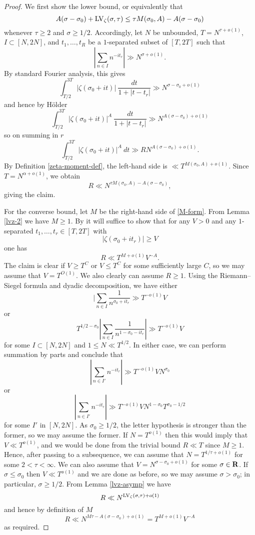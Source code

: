 \begin{proof}  We first show the lower bound, or equivalently that
$$ A(\sigma-\sigma_0) + \mathrm{LV}_\zeta(\sigma,\tau) \leq \tau M(\sigma_0,A) - A(\sigma-\sigma_0)$$
whenever $\tau \geq 2$ and $\sigma \geq 1/2$.  Accordingly, let $N$ be unbounded, $T = N^{\tau+o(1)}$, $I \subset [N,2N]$, and $t_1,\dots,t_R$ be a $1$-separated subset of $[T,2T]$ such that
$$ |\sum_{n \in I} n^{-it_r}| \gg N^{\sigma+o(1)}.$$
By standard Fourier analysis, this gives
$$ \int_{T/2}^{3T} |\zeta(\sigma_0+it)|\ \frac{dt}{1+|t-t_r|} \gg N^{\sigma - \sigma_0 + o(1)}$$
and hence by H\"older
$$ \int_{T/2}^{3T} |\zeta(\sigma_0+it)|^A\ \frac{dt}{1+|t-t_r|} \gg N^{A(\sigma - \sigma_0) + o(1)}$$
so on summing in $r$
$$ \int_{T/2}^{3T} |\zeta(\sigma_0+it)|^A\ dt \gg R N^{A(\sigma - \sigma_0) + o(1)}.$$
By Definition \ref{zeta-moment-def}, the left-hand side is $\ll T^{M(\sigma_0,A)+o(1)}$.  Since $T = N^{\alpha+o(1)}$, we obtain
$$ R \ll N^{\tau M(\sigma_0,A) - A(\sigma-\sigma_0)},$$
giving the claim.

For the converse bound, let $M$ be the right-hand side of \eqref{M-form}.  From Lemma \ref{lvz-2} we have $M \geq 1$. By \cite[\S 8.1]{ivic} it will suffice to show that for any $V>0$ and any $1$-separated $t_1,\dots,t_r \in [T,2T]$ with
$$ |\zeta(\sigma_0+it_r)| \geq V$$
one has
$$ R \ll T^{M+o(1)} V^{-A}.$$
The claim is clear if $V \geq T^C$ or $V \leq T^C$ for some sufficiently large $C$, so we may assume that $V = T^{O(1)}$.  We also clearly can assume $R \geq 1$.  Using the Riemann--Siegel formula and dyadic decomposition, we have either
$$ |\sum_{n \in I} \frac{1}{n^{\sigma_0+it_r}} \gg T^{-o(1)} V$$
or
$$ T^{1/2-\sigma_0} |\sum_{n \in I} \frac{1}{n^{1-\sigma_0-it_r}}| \gg T^{-o(1)} V$$
for some $I \subset [N,2N]$ and $1 \leq N \ll T^{1/2}$.  In either case, we can perform summation by parts and conclude that
$$ |\sum_{n \in I'} n^{-it_r}|\gg T^{-o(1)} V N^{\sigma_0}$$
or
$$ |\sum_{n \in I'} n^{-it_r}|\gg T^{-o(1)} V N^{1-\sigma_0} T^{\sigma_0-1/2}$$
for some $I'$ in $[N,2N]$.  As $\sigma_0 \geq 1/2$, the letter hypothesis is stronger than the former, so we may assume the former.  If $N = T^{o(1)}$ then this would imply that $V \ll T^{o(1)}$, and we would be done from the trivial bound $R \ll T$ since $M \geq 1$.
Hence, after passing to a subsequence, we can assume that $N = T^{1/\tau+o(1)}$ for some $2 < \tau < \infty$.  We can also assume that $V = N^{\sigma-\sigma_0+o(1)}$ for some $\sigma \in \mathbf{R}$. If $\sigma \leq \sigma_0$ then $V \ll T^{o(1)}$ and we are done as before, so we may assume $\sigma > \sigma_0$; in particular, $\sigma \geq 1/2$.  From Lemma \ref{lvz-asymp} we have
$$ R \ll N^{\mathrm{LV}_\zeta(\sigma,\tau)+o(1)}$$
and hence by definition of $M$
$$ R \ll N^{M \tau - A (\sigma-\sigma_0)+o(1)} = T^{M+o(1)} V^{-A}$$
as required.
\end{proof}

